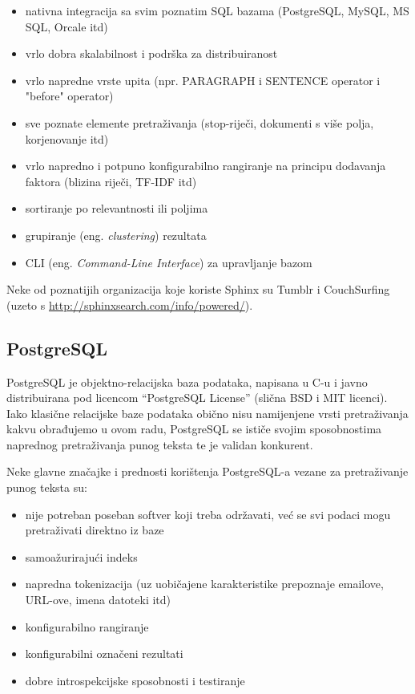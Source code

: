 \documentclass[a4paper,twoside,12pt]{scrreprt}
\begin{document}
\begin{itemize}
  \item nativna integracija sa svim poznatim SQL bazama (PostgreSQL, MySQL, MS SQL, Orcale itd)
  \item vrlo dobra skalabilnost i podrška za distribuiranost
  \item vrlo napredne vrste upita (npr. PARAGRAPH i SENTENCE operator i "before" operator)
  \item sve poznate elemente pretraživanja (stop-riječi, dokumenti s više polja, korjenovanje itd)
  \item vrlo napredno i potpuno konfigurabilno rangiranje na principu dodavanja faktora (blizina riječi, TF-IDF itd)
  \item sortiranje po relevantnosti ili poljima
  \item grupiranje (eng. \textit{clustering}) rezultata
  \item CLI (eng. \textit{Command-Line Interface}) za upravljanje bazom
\end{itemize}

Neke od poznatijih organizacija koje koriste Sphinx su Tumblr i CouchSurfing (uzeto s \url{http://sphinxsearch.com/info/powered/}).

\subsection{PostgreSQL}

PostgreSQL je objektno-relacijska baza podataka, napisana u C-u i javno distribuirana pod licencom ``PostgreSQL License'' (slična BSD i MIT licenci). Iako klasične relacijske baze podataka obično nisu namijenjene vrsti pretraživanja kakvu obrađujemo u ovom radu, PostgreSQL se ističe svojim sposobnostima naprednog pretraživanja punog teksta te je validan konkurent.

Neke glavne značajke i prednosti korištenja PostgreSQL-a vezane za pretraživanje punog teksta su:

\begin{itemize}
  \item nije potreban poseban softver koji treba održavati, već se svi podaci mogu pretraživati direktno iz baze
  \item samoažurirajući indeks
  \item napredna tokenizacija (uz uobičajene karakteristike prepoznaje emailove, URL-ove, imena datoteki itd)
  \item konfigurabilno rangiranje
  \item konfigurabilni označeni rezultati
  \item dobre introspekcijske sposobnosti i testiranje
\end{itemize}
\end{document}
